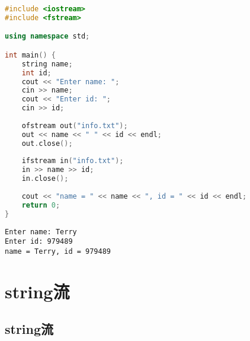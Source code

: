 \begin{table}[H]
	\centering
	\caption{文件打开模式}
\end{table}


\begin{lstlisting}[language=C++]
#include <iostream>
#include <fstream>

using namespace std;

int main() {
    string name;
    int id;
    cout << "Enter name: ";
    cin >> name;
    cout << "Enter id: ";
    cin >> id;
    
    ofstream out("info.txt");
    out << name << " " << id << endl;
    out.close();
    
    ifstream in("info.txt");
    in >> name >> id;
    in.close();
    
    cout << "name = " << name << ", id = " << id << endl;
    return 0;
}
\end{lstlisting}

\begin{tcolorbox}
	\begin{verbatim}
Enter name: Terry
Enter id: 979489
name = Terry, id = 979489
	\end{verbatim}
\end{tcolorbox}

\newpage

\section{string流}

\subsection{string流}

